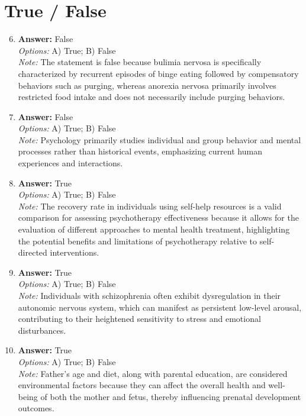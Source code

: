 \documentclass[12pt]{article}
\begin{document}
\section*{True / False}
\begin{enumerate}[label=\arabic*.]
\setcounter{enumi}{5}
\item \textbf{Answer:} False
\\ \textit{Options:} A) True; B) False
\\ \textit{Note:} The statement is false because bulimia nervosa is specifically characterized by recurrent episodes of binge eating followed by compensatory behaviors such as purging, whereas anorexia nervosa primarily involves restricted food intake and does not necessarily include purging behaviors.
\item \textbf{Answer:} False
\\ \textit{Options:} A) True; B) False
\\ \textit{Note:} Psychology primarily studies individual and group behavior and mental processes rather than historical events, emphasizing current human experiences and interactions.
\item \textbf{Answer:} True
\\ \textit{Options:} A) True; B) False
\\ \textit{Note:} The recovery rate in individuals using self-help resources is a valid comparison for assessing psychotherapy effectiveness because it allows for the evaluation of different approaches to mental health treatment, highlighting the potential benefits and limitations of psychotherapy relative to self-directed interventions.
\item \textbf{Answer:} True
\\ \textit{Options:} A) True; B) False
\\ \textit{Note:} Individuals with schizophrenia often exhibit dysregulation in their autonomic nervous system, which can manifest as persistent low-level arousal, contributing to their heightened sensitivity to stress and emotional disturbances.
\item \textbf{Answer:} True
\\ \textit{Options:} A) True; B) False
\\ \textit{Note:} Father's age and diet, along with parental education, are considered environmental factors because they can affect the overall health and well-being of both the mother and fetus, thereby influencing prenatal development outcomes.
\end{enumerate}
\end{document}
